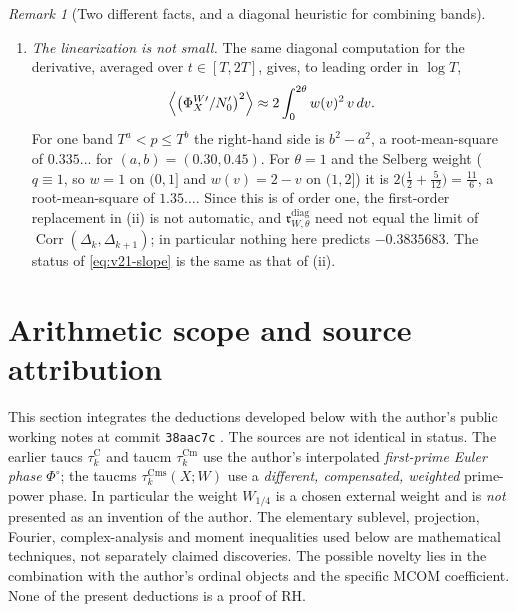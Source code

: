 \documentclass[11pt,a4paper]{article}
\numberwithin{equation}{section}
\theoremstyle{definition}
\theoremstyle{remark}
\newtheorem{remark}[theorem]{Remark}
\newcommand{\Cm}{\mathrm{Cm}}
\newcommand{\Cms}{\mathrm{Cms}}
\begin{document}
\begin{remark}[Two different facts, and a diagonal heuristic for combining bands]
\begin{enumerate}[label=(\roman*),leftmargin=*]
\item \emph{The linearization is not small.} The same diagonal computation for the derivative, averaged over $t\in[T,2T]$, gives, to leading order in $\log T$,
\begin{equation}\label{eq:v21-slope}
 \Bigl\langle\bigl(\Phi_X^{W\prime}/N_0'\bigr)^2\Bigr\rangle\approx2\int_0^{2\theta}w(v)^2\,v\,dv .
\end{equation}
For one band $T^a<p\le T^b$ the right-hand side is $b^2-a^2$, a root-mean-square of $0.335\ldots$ for $(a,b)=(0.30,0.45)$. For $\theta=1$ and the Selberg weight ($q\equiv1$, so $w=1$ on $(0,1]$ and $w(v)=2-v$ on $(1,2]$) it is $2\bigl(\tfrac12+\tfrac5{12}\bigr)=\tfrac{11}6$, a root-mean-square of $1.35\ldots$. Since this is of order one, the first-order replacement in (ii) is not automatic, and $\mathfrak r^{\mathrm{diag}}_{W,\theta}$ need not equal the limit of $\operatorname{Corr}(\Delta_k,\Delta_{k+1})$; in particular nothing here predicts $-0.3835683$. The status of \eqref{eq:v21-slope} is the same as that of (ii).
\end{enumerate}
\end{remark}

\section{Arithmetic scope and source attribution}\label{sec:v7-scope}
This section integrates the deductions developed below
with the author's public working notes at commit
\texttt{38aac7c} \cite{CasanaV10Notes,CasanaV10Transport}.
The sources are not identical in status. The earlier taucs
$\tau_k^{\mathrm C}$ and taucm $\tau_k^{\Cm}$ use the author's
interpolated \emph{first-prime Euler phase} $\Phi^\circ$; the taucms
$\tau_k^{\Cms}(X;W)$ use a \emph{different, compensated, weighted}
prime-power phase. In particular the weight $W_{1/4}$ is a chosen
external weight and is \emph{not} presented as an invention
of the author. The elementary sublevel, projection, Fourier,
complex-analysis and moment inequalities used below are mathematical
techniques, not separately claimed discoveries. The possible novelty
lies in the combination with the author's ordinal objects and the
specific MCOM coefficient. None of the present deductions is a
proof of RH.
\end{document}
